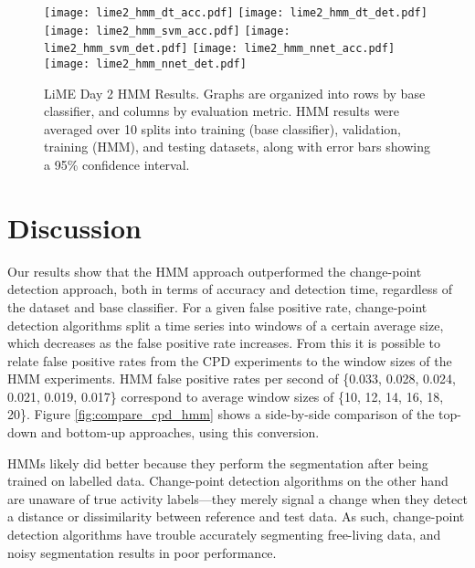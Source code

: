 \begin{figure}[H]
 \centering
 \texttt{[image: lime2\_hmm\_dt\_acc.pdf]} \hspace{1em}\vspace{1em}
 \texttt{[image: lime2\_hmm\_dt\_det.pdf]}
 \texttt{[image: lime2\_hmm\_svm\_acc.pdf]} \hspace{1em}\vspace{1em}
 \texttt{[image: lime2\_hmm\_svm\_det.pdf]}
 \texttt{[image: lime2\_hmm\_nnet\_acc.pdf]} \hspace{1em}
 \texttt{[image: lime2\_hmm\_nnet\_det.pdf]}
 \caption{LiME Day 2 HMM Results.
  Graphs are organized into rows by base classifier, and columns by evaluation
  metric. HMM results were averaged over 10 splits into training
  (base classifier), validation, training (HMM), and testing datasets, along with 
  error bars showing a 95\% confidence interval.}
 \label{fig:lime2_hmm}
\end{figure}

\newpage

\section{Discussion}

Our results show that the HMM approach outperformed the change-point
detection approach, both in terms of accuracy and detection time, regardless of
the dataset and base classifier. For a given false positive rate, change-point
detection algorithms split a time series into windows of a certain average size,
which decreases as the false positive rate increases. From this it is possible
to relate false positive rates from the CPD experiments to the window sizes of
the HMM experiments. HMM false positive rates per second of
\{0.033, 0.028, 0.024, 0.021, 0.019, 0.017\} correspond to average
window sizes of \{10, 12, 14, 16, 18, 20\}. Figure \ref{fig:compare_cpd_hmm}
shows a side-by-side comparison of the top-down and bottom-up approaches, using
this conversion. 

HMMs likely
did better because they perform the segmentation after being trained on labelled
data. Change-point detection algorithms on the other hand are unaware of true
activity labels---they merely signal a change when they detect a distance or
dissimilarity between reference and test data. As such, change-point detection
algorithms have trouble accurately segmenting free-living data, and noisy
segmentation results in poor performance.

